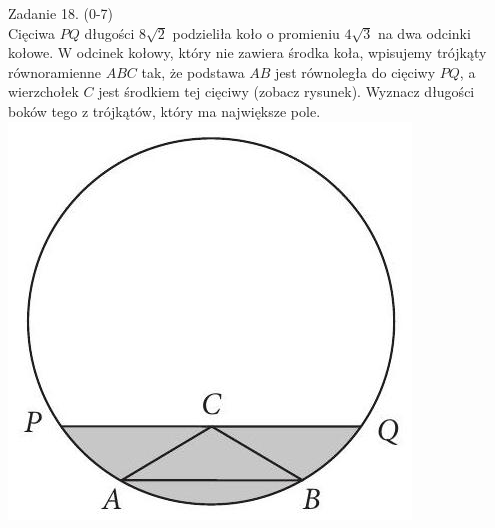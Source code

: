 \documentclass[10pt]{article}
\begin{document}
Zadanie 18. (0-7)\\
Cięciwa \(P Q\) długości \(8 \sqrt{2}\) podzieliła koło o promieniu \(4 \sqrt{3}\) na dwa odcinki kołowe. W odcinek kołowy, który nie zawiera środka koła, wpisujemy trójkąty równoramienne \(A B C\) tak, że podstawa \(A B\) jest równoległa do cięciwy \(P Q\), a wierzchołek \(C\) jest środkiem tej cięciwy (zobacz rysunek). Wyznacz długości boków tego z trójkątów, który ma największe pole.\\
\includegraphics[max width=\textwidth, center]{2024_11_21_8206013b40ecc9b11a30g-16}
\end{document}
